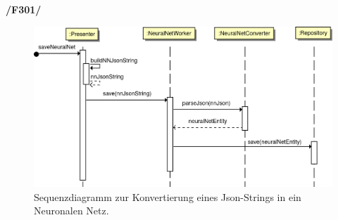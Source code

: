 \textbf{/F301/} 
\begin{figure}[H]
\begin{center}
\includegraphics[width=15cm]{Abbildungen/UML/jan/convertJsonNNSD.png}
\caption{Sequenzdiagramm zur Konvertierung eines Json-Strings in ein Neuronalen Netz.}
\label{fig_sdBackpropagation}
\end{center}
\end{figure}
